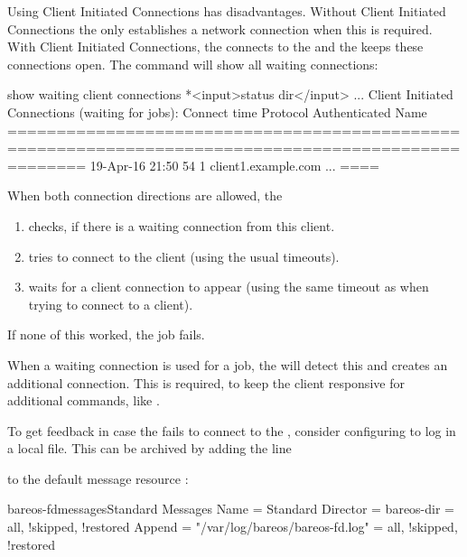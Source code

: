 Using Client Initiated Connections has disadvantages.
Without Client Initiated Connections the \bareosDir only establishes a network connection when this is required.
With Client Initiated Connections, the \bareosFd connects to the \bareosDir and the \bareosDir keeps these connections open.
The command  will show all waiting connections:
\begin{bconsole}{show waiting client connections}
*<input>status dir</input>
...
Client Initiated Connections (waiting for jobs):
Connect time        Protocol            Authenticated       Name
====================================================================================================
19-Apr-16 21:50     54                  1                   client1.example.com
...
====
\end{bconsole}

When both connection directions are allowed, the \bareosDir 
\begin{enumerate}
  \item checks, if there is a waiting connection from this client.
  \item tries to connect to the client (using the usual timeouts).
  \item waits for a client connection to appear (using the same timeout as when trying to connect to a client).
\end{enumerate}
If none of this worked, the job fails.

When a waiting connection is used for a job, the \bareosFd will detect this and creates an additional connection.
This is required, to keep the client responsive for additional commands, like .

To get feedback in case the \bareosFd fails to connect to the \bareosDir, consider configuring \bareosFd to log in a local file.
This can be archived by adding the line


to the default message resource :

\begin{bareosConfigResource}{bareos-fd}{messages}{Standard}
Messages {
  Name = Standard
  Director = bareos-dir = all, !skipped, !restored
  Append = "/var/log/bareos/bareos-fd.log" = all, !skipped, !restored
}
\end{bareosConfigResource}
